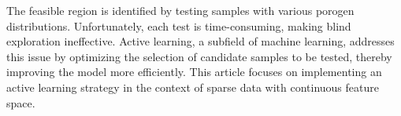 \documentclass[10pt]{article}
\newenvironment{Figure}
  {\par\medskip\noindent\minipage{\linewidth}}
  {\endminipage\par\medskip}
\begin{document}
\begin{multicols}{2}
The feasible region is identified by testing samples with various porogen distributions. Unfortunately, each test is time-consuming, making blind exploration ineffective. Active learning, a subfield of machine learning, addresses this issue by optimizing the selection of candidate samples to be tested, thereby improving the model more efficiently. This article focuses on implementing an active learning strategy in the context of sparse data with continuous feature space.


\end{multicols}

\pagebreak
\tableofcontents
\pagebreak
\end{document}
